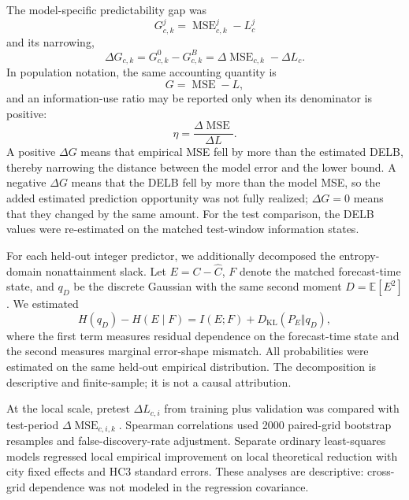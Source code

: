 The model-specific predictability gap was
\begin{equation}
G^j_{c,k}=\operatorname{MSE}^{j}_{c,k}-L^j_c
\label{eq:empirical_gap}
\end{equation}
and its narrowing,
\begin{equation}
\Delta G_{c,k}
=G^0_{c,k}-G^B_{c,k}
=\Delta\operatorname{MSE}_{c,k}-\Delta L_c.
\label{eq:empirical_gap_narrowing}
\end{equation}
In population notation, the same accounting quantity is
\begin{equation}
G=\operatorname{MSE}-L,
\label{eq:prediction_gap}
\end{equation}
and an information-use ratio may be reported only when its denominator is
positive:
\begin{equation}
\eta=\frac{\Delta\operatorname{MSE}}{\Delta L}.
\label{eq:bound_efficiency}
\end{equation}
A positive \(\Delta G\) means that empirical MSE fell by more than the
estimated DELB, thereby narrowing the distance between the model error and
the lower bound. A negative \(\Delta G\) means that the DELB fell by more than
the model MSE, so the added estimated prediction opportunity was not fully
realized; \(\Delta G=0\) means that they changed by the same amount. For the test comparison,
the DELB values were re-estimated on the matched test-window information
states.

{\color{red}For each held-out integer predictor, we additionally decomposed the
entropy-domain nonattainment slack. Let \(E=C-\widehat C\), \(F\) denote the
matched forecast-time state, and \(q_D\) be the discrete Gaussian with the
same second moment \(D=\mathbb E[E^2]\). We estimated
\[
H(q_D)-H(E\mid F)=I(E;F)+D_{\mathrm{KL}}(P_E\Vert q_D),
\]
where the first term measures residual dependence on the forecast-time state
and the second measures marginal error-shape mismatch. All probabilities were
estimated on the same held-out empirical distribution. The decomposition is
descriptive and finite-sample; it is not a causal attribution.}

At the local scale, pretest \(\Delta L_{c,i}\) from training plus
validation was compared with test-period
\(\Delta\operatorname{MSE}_{c,i,k}\). Spearman correlations used 2000
paired-grid bootstrap resamples and false-discovery-rate adjustment.
Separate ordinary least-squares models regressed local empirical
improvement on local theoretical reduction with city fixed effects and
HC3 standard errors. These analyses are descriptive: cross-grid dependence
was not modeled in the regression covariance.


